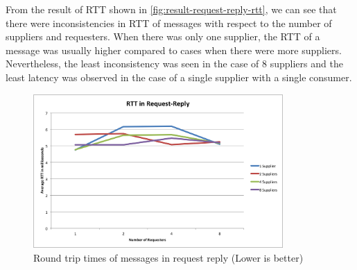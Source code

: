   From the result of RTT shown in \autoref{fig:result-request-reply-rtt}, we can see that there were inconsistencies in RTT of messages with respect to the number of suppliers and requesters. When there was only one supplier, the RTT of a message was usually higher compared to cases when there were more suppliers. Nevertheless, the least inconsistency was seen in the case of 8 suppliers and the least latency was observed in the case of a single supplier with a single consumer.

  \begin{figure}[H]
    \centering    \includegraphics[width=0.85\textwidth]{figures/10request-reply-rtt}
    \caption[Round trip times of messages in request reply]{Round trip times of messages in request reply (Lower is better)}
    \label{fig:result-request-reply-rtt}
  \end{figure}
